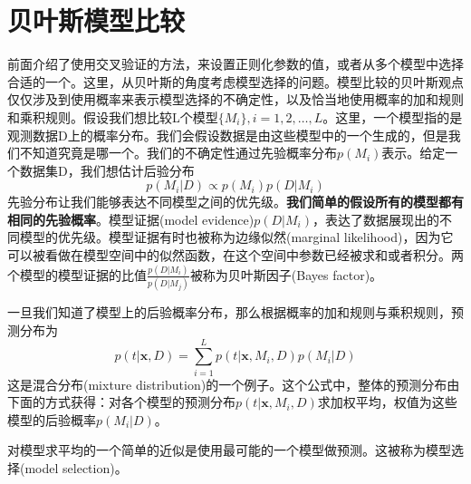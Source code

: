 \section{贝叶斯模型比较}
前面介绍了使用交叉验证的方法，来设置正则化参数的值，或者从多个模型中选择合适的一个。这里，从贝叶斯的角度考虑模型选择的问题。模型比较的贝叶斯观点仅仅涉及到使用概率来表示模型选择的不确定性，以及恰当地使用概率的加和规则和乘积规则。假设我们想比较L个模型$\{M_i\},i=1,2,\dots,L$。这里，一个模型指的是观测数据D上的概率分布。我们会假设数据是由这些模型中的一个生成的，但是我们不知道究竟是哪一个。我们的不确定性通过先验概率分布$p(M_i)$表示。给定一个数据集D，我们想估计后验分布
\begin{equation}
	p(M_i|D)\propto p(M_i)p(D|M_i)
\end{equation}
先验分布让我们能够表达不同模型之间的优先级。\textbf{我们简单的假设所有的模型都有相同的先验概率}。模型证据(model evidence)$p(D|M_i)$，表达了数据展现出的不同模型的优先级。模型证据有时也被称为边缘似然(marginal likelihood)，因为它可以被看做在模型空间中的似然函数，在这个空间中参数已经被求和或者积分。两个模型的模型证据的比值$\frac{p(D|M_i)}{p(D|M_j)}$被称为贝叶斯因子(Bayes factor)。

一旦我们知道了模型上的后验概率分布，那么根据概率的加和规则与乘积规则，预测分布为
\begin{equation}
	p(t|\boldsymbol{x},D)=\sum_{i=1}^{L}p(t|\boldsymbol{x},M_i,D)p(M_i|D)
\end{equation}
这是混合分布(mixture distribution)的一个例子。这个公式中，整体的预测分布由下面的方式获得：对各个模型的预测分布$p(t|\boldsymbol{x},M_i,D)$求加权平均，权值为这些模型的后验概率$p(M_i|D)$。

对模型求平均的一个简单的近似是使用最可能的一个模型做预测。这被称为模型选择(model selection)。

